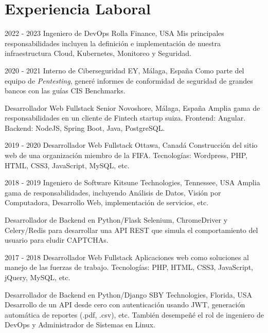 \documentclass[]{friggeri-cv}
\begin{document}
\section{Experiencia Laboral}
\begin{entrylist}
  \entry
    {2022 - 2023}
    {Ingeniero de DevOps}
    {Rolla Finance, USA}
    {Mis principales responsabilidades incluyen la definición e implementación de nuestra infraestructura Cloud, Kubernetes, Monitoreo y Seguridad.\\}

  \entry
    {2020 - 2021}
    {Interno de Ciberseguridad}
    {EY, Málaga, España}
    {Como parte del equipo de \emph{Pentesting}, generé informes de conformidad de seguridad de grandes bancos con las guías CIS Benchmarks.\\}

  \entry
    {}
    {Desarrollador Web Fullstack Senior}
    {Novoshore, Málaga, España}
    {Amplia gama de responsabilidades en un cliente de Fintech startup suiza. Frontend: Angular. Backend: NodeJS, Spring Boot, Java, PostgreSQL.\\}

  \entry
    {2019 - 2020}
    {Desarrollador Web Fullstack}
    {Ottawa, Canadá} %
    {Construcción del sitio web de una organización miembro de la FIFA. Tecnologías: Wordpress, PHP, HTML, CSS3, JavaScript, MySQL, etc.\\}

  \entry
    {2018 - 2019}
    {Ingeniero de Software}
    {Kitsune Technologies, Tennessee, USA}
    {Amplia gama de responsabilidades, incluyendo Análisis de Datos, Visión por Computadora, Desarrollo Web, implementación de servicios, etc.\\}

  \entry
    {}
    {Desarrollador de Backend en Python/Flask}
    {} 
    {Selenium, ChromeDriver y Celery/Redis para desarrollar una API REST que simula el comportamiento del usuario para eludir CAPTCHAs.\\}

  \entry
    {2017 - 2018}
    {Desarrollador Web Fullstack}
    {}
    {Aplicaciones web como soluciones al manejo de las fuerzas de trabajo. Tecnologías: PHP, HTML, CSS3, JavaScript, jQuery, MySQL, etc.\\}

  \entry
    {}
    {Desarrollador de Backend en Python/Django}
    {SBY Technologies, Florida, USA}
    {Desarrollo de un API desde cero con autenticación usando JWT, generación automática de reportes (.pdf, .csv), etc. También desempeñé el rol de ingeniero de DevOps y Administrador de Sistemas en Linux.\\}


\end{entrylist}
\end{document}
